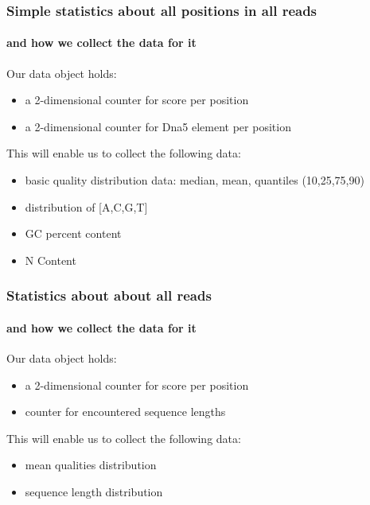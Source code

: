 \documentclass{beamer}
\begin{document}
\begin{frame}
 \frametitle{ Simple statistics about all positions in all reads }
 \framesubtitle{and how we collect the data for it}

Our data object holds:

 \begin{itemize}
  \item a 2-dimensional counter for score per position 
  \item a 2-dimensional counter for Dna5 element per position 
 \end{itemize}

This will enable us to collect the following data:

\begin{itemize}
 \item basic quality distribution data: median, mean, quantiles (10,25,75,90)
 \item distribution of [A,C,G,T]
 \item GC percent content
 \item N Content
\end{itemize}

\end{frame}


\begin{frame}
 \frametitle{ Statistics about about all reads}
 \framesubtitle{and how we collect the data for it}

Our data object holds:

 \begin{itemize}
  \item a 2-dimensional counter for score per position 
  \item counter for encountered sequence lengths 
 \end{itemize}

This will enable us to collect the following data:
  \begin{itemize}
    \item mean qualities distribution
    \item sequence length distribution
  \end{itemize}
\end{frame}
\end{document}
